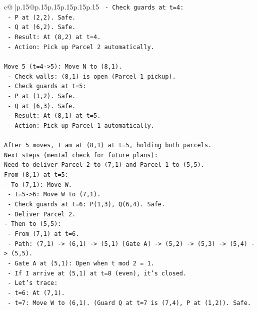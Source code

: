 \documentclass{article}
\begin{document}
{\begin{supertabular}{c@{$\;$}|p{.15\linewidth}@{}p{.15\linewidth}p{.15\linewidth}p{.15\linewidth}p{.15\linewidth}p{.15\linewidth}}
{{{\texttt{  {-} Check guards at t=4:} \\
\texttt{    {-} P at (2,2). Safe.} \\
\texttt{    {-} Q at (6,2). Safe.} \\
\texttt{  {-} Result: At (8,2) at t=4.} \\
\texttt{  {-} Action: Pick up Parcel 2 automatically.} \\
\\ 
\texttt{Move 5 (t=4{-}>5): Move N to (8,1).} \\
\texttt{  {-} Check walls: (8,1) is open (Parcel 1 pickup).} \\
\texttt{  {-} Check guards at t=5:} \\
\texttt{    {-} P at (1,2). Safe.} \\
\texttt{    {-} Q at (6,3). Safe.} \\
\texttt{  {-} Result: At (8,1) at t=5.} \\
\texttt{  {-} Action: Pick up Parcel 1 automatically.} \\
\\ 
\texttt{After 5 moves, I am at (8,1) at t=5, holding both parcels.} \\
\texttt{Next steps (mental check for future plans):} \\
\texttt{Need to deliver Parcel 2 to (7,1) and Parcel 1 to (5,5).} \\
\texttt{From (8,1) at t=5:} \\
\texttt{{-} To (7,1): Move W.} \\
\texttt{  {-} t=5{-}>6: Move W to (7,1).} \\
\texttt{  {-} Check guards at t=6: P(1,3), Q(6,4). Safe.} \\
\texttt{  {-} Deliver Parcel 2.} \\
\texttt{{-} Then to (5,5):} \\
\texttt{  {-} From (7,1) at t=6.} \\
\texttt{  {-} Path: (7,1) {-}> (6,1) {-}> (5,1) {[}Gate A{]} {-}> (5,2) {-}> (5,3) {-}> (5,4) {-}> (5,5).} \\
\texttt{  {-} Gate A at (5,1): Open when t mod 2 = 1.} \\
\texttt{  {-} If I arrive at (5,1) at t=8 (even), it's closed.} \\
\texttt{  {-} Let's trace:} \\
\texttt{    {-} t=6: At (7,1).} \\
\texttt{    {-} t=7: Move W to (6,1). (Guard Q at t=7 is (7,4), P at (1,2)). Safe.} \\
}}}
\end{supertabular}}
\end{document}
